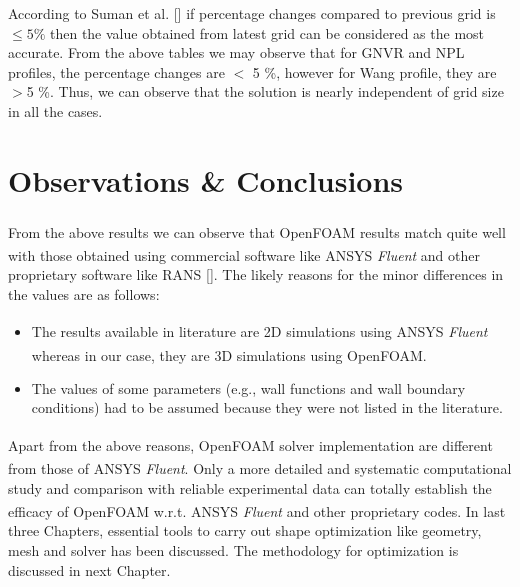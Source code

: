 According to Suman et al. [] if percentage changes compared to previous grid is $\le 5 \%$ then the value obtained from latest grid can be considered as the most accurate. From the above tables we may observe that for GNVR and NPL profiles, the percentage changes are $<$  5 \%, however for Wang profile, they are $>$5 \%. Thus, we can observe that the solution is nearly independent of grid size in all the cases.

\section{Observations \& Conclusions}

From the above results we can observe that OpenFOAM\textsuperscript{\textregistered} results match quite well with those obtained using commercial software like ANSYS\textsuperscript{\textregistered} \textit{Fluent} and other proprietary software like RANS []. The likely reasons for the minor differences in the values are as follows:
\begin{itemize}
	\item The results available in literature are 2D simulations using ANSYS\textsuperscript{\textregistered} \textit{Fluent} whereas in our case, they are 3D simulations using OpenFOAM\textsuperscript{\textregistered}.
	\item The values of some parameters (e.g., wall functions and wall boundary conditions) had to be assumed because they were not listed in the literature.
\end{itemize}
Apart from the above reasons, OpenFOAM\textsuperscript{\textregistered} solver implementation are different from those of ANSYS\textsuperscript{\textregistered} \textit{Fluent}. Only a more detailed and systematic computational study and comparison with reliable experimental data can totally establish the efficacy of OpenFOAM\textsuperscript{\textregistered} w.r.t. ANSYS\textsuperscript{\textregistered} \textit{Fluent} and other proprietary codes.
In last three Chapters, essential tools to carry out shape optimization like geometry, mesh and solver has been discussed. The methodology for optimization is discussed in next Chapter.





